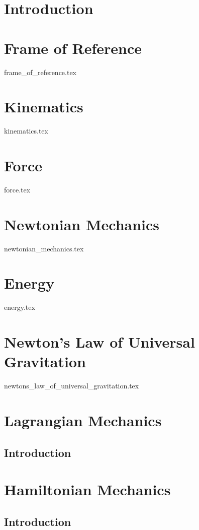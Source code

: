 \chapter{Introduction}
\chapter{Frame of Reference}
{frame_of_reference.tex}

\chapter{Kinematics}
{kinematics.tex}

\chapter{Force}
{force.tex}
	
\chapter{Newtonian Mechanics}
{newtonian_mechanics.tex}

\chapter{Energy}
{energy.tex}

\chapter{Newton's Law of Universal Gravitation}
{newtons_law_of_universal_gravitation.tex}

\chapter{Lagrangian Mechanics}
\section{Introduction}
\subsection{ }

\chapter{Hamiltonian Mechanics}
\section{Introduction}
\subsection{ }